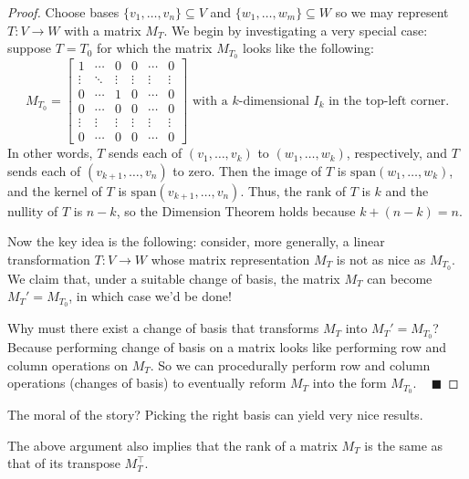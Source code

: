 \begin{proof}
    Choose bases $\{v_1, \dots, v_n\} \subseteq V$ and $\{w_1, \dots, w_m \} \subseteq W$ so we may represent $T: V \to W$ with a matrix $M_T$.  We begin by investigating a very special case: suppose $T = T_0$ for which the matrix $M_{T_0}$ looks like the following:
    \[ M_{T_0} = \begin{bmatrix}
        1 & \cdots & 0 & 0 & \cdots & 0 \\ \vdots & \ddots & \vdots & \vdots & \vdots & \vdots \\ 0 & \cdots & 1 & 0 & \cdots & 0  \\ 0 & \cdots & 0 & 0 & \cdots & 0 \\ \vdots & \vdots & \vdots & \vdots & \vdots & \vdots \\ 0 & \cdots & 0 & 0 & \cdots & 0 \end{bmatrix} \text{ with a } k\text{-dimensional } I_k \text{ in the top-left corner.} \]
    In other words, $T$ sends each of $(v_1, \dots, v_k)$ to $(w_1, \dots, w_k)$, respectively, and $T$ sends each of $(v_{k + 1}, \dots, v_n)$ to zero.  Then the image of $T$ is $\mathrm{span}(w_1, \dots, w_k)$, and the kernel of $T$ is $\mathrm{span}(v_{k + 1}, \dots, v_n)$.  Thus, the rank of $T$ is $k$ and the nullity of $T$ is $n - k$, so the Dimension Theorem holds because $k + (n - k) = n$.

    Now the key idea is the following: consider, more generally, a linear transformation $T: V \to W$ whose matrix representation $M_T$ is not as nice as $M_{T_0}$.  We claim that, under a suitable change of basis, the matrix $M_T$ can become $M_T' = M_{T_0}$, in which case we'd be done!

    Why must there exist a change of basis that transforms $M_T$ into $M_T' = M_{T_0}$?  Because performing change of basis on a matrix looks like performing row and column operations on $M_T$.  So we can procedurally perform row and column operations (changes of basis) to eventually reform $M_T$ into the form $M_{T_0}$. ~ $\blacksquare$
\end{proof}

The moral of the story?  Picking the right basis can yield very nice results.

\begin{remark}
    The above argument also implies that the rank of a matrix $M_T$ is the same as that of its transpose $M_T^{\top}$.
\end{remark}

